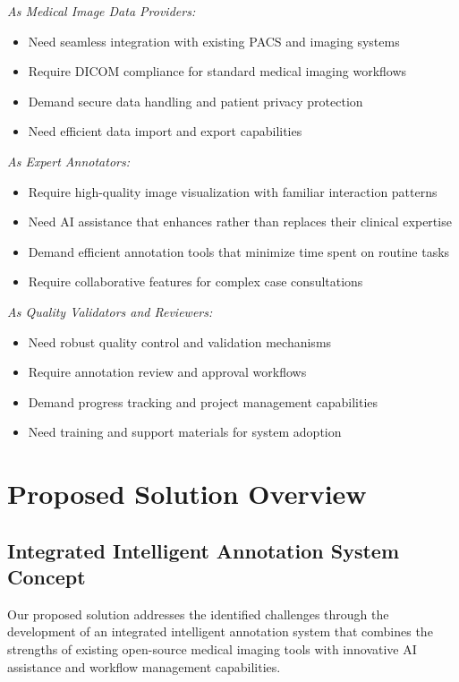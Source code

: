 \textit{As Medical Image Data Providers:}
\begin{itemize}
    \item Need seamless integration with existing PACS and imaging systems
    \item Require DICOM compliance for standard medical imaging workflows
    \item Demand secure data handling and patient privacy protection
    \item Need efficient data import and export capabilities
\end{itemize}

\textit{As Expert Annotators:}
\begin{itemize}
    \item Require high-quality image visualization with familiar interaction patterns
    \item Need AI assistance that enhances rather than replaces their clinical expertise
    \item Demand efficient annotation tools that minimize time spent on routine tasks
    \item Require collaborative features for complex case consultations
\end{itemize}

\textit{As Quality Validators and Reviewers:}
\begin{itemize}
    \item Need robust quality control and validation mechanisms
    \item Require annotation review and approval workflows
    \item Demand progress tracking and project management capabilities
    \item Need training and support materials for system adoption
\end{itemize}

\section{Proposed Solution Overview}

\subsection{Integrated Intelligent Annotation System Concept}

Our proposed solution addresses the identified challenges through the development of an integrated intelligent annotation system that combines the strengths of existing open-source medical imaging tools with innovative AI assistance and workflow management capabilities.

